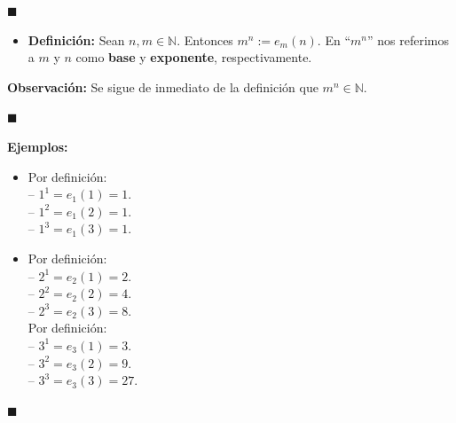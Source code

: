 \documentclass[10 pt]{article}
\begin{document}
\begin{flushright}
    $\blacksquare$
\end{flushright}

\begin{itemize}
    \item \Large{\textbf{Definición:} Sean $n,m \in \mathbb N$. Entonces $m^n:=e_m(n)$. En ``$m^n$'' nos referimos a $m$ y $n$ como \textbf{base} y \textbf{exponente}, respectivamente.} \\
\end{itemize}

\Large{\textbf{Observación:} Se sigue de inmediato de la definición que $m^n \in \mathbb N$.} \\

\begin{flushright}
    $\blacksquare$
\end{flushright}

\Large{\textbf{Ejemplos:}} \\

\begin{itemize}
    \item \Large{Por definición: \\

    -- $1^1=e_1(1)=1$. \\

    -- $1^2=e_1(2)=1$. \\

    -- $1^3=e_1(3)=1$.} \\

    \item \Large{Por definición: \\

    -- $2^1=e_2(1)=2$. \\

    -- $2^2=e_2(2)=4$. \\

    -- $2^3=e_2(3)=8$.} \\

    \Large{Por definición: \\

    -- $3^1=e_3(1)=3$. \\

    -- $3^2=e_3(2)=9$. \\

    -- $3^3=e_3(3)=27$.}\\
\end{itemize}

\begin{flushright}
    $\blacksquare$
\end{flushright}
\end{document}
